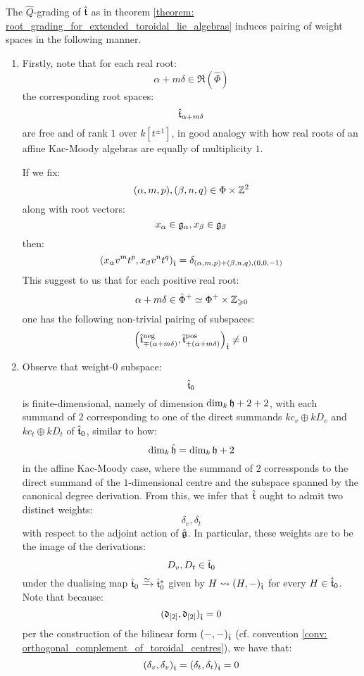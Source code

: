         \begin{remark} \label{remark: toroidal_root_systems}
            The $\hat{Q}$-grading of $\hat{\mathfrak{t}}$ as in theorem \ref{theorem: root_grading_for_extended_toroidal_lie_algebras} induces pairing of weight spaces in the following manner.
            \begin{enumerate}
                \item  Firstly, note that for each real root:
                    $$\alpha + m\delta \in \Re(\hat{\Phi})$$
                the corresponding root spaces:
                    $$\hat{\mathfrak{t}}_{\alpha + m\delta}$$
                are free and of rank $1$ over $k[t^{\pm 1}]$, in good analogy with how real roots of an affine Kac-Moody algebras are equally of multiplicity $1$.

                If we fix:
                    $$(\alpha, m, p), (\beta, n, q) \in \Phi \x \Z^2$$
                along with root vectors:
                    $$x_{\alpha} \in \mathfrak{g}_{\alpha}, x_{\beta} \in \mathfrak{g}_{\beta}$$
                then:
                    $$( x_{\alpha} v^m t^p, x_{\beta} v^n t^q )_{\hat{\mathfrak{t}}} = \delta_{(\alpha, m, p) + (\beta, n, q), (0, 0, -1)}$$
                This suggest to us that for each positive real root:
                    $$\alpha + m\delta \in \hat{\Phi}^+ \cong \Phi^+ \x \Z_{\geq 0}$$
                one has the following non-trivial pairing of subspaces:
                    $$\left( \hat{\mathfrak{t}}^{\mathrm{neg}}_{\mp (\alpha + m\delta)}, \hat{\mathfrak{t}}^{\mathrm{pos}}_{\pm (\alpha + m\delta)} \right)_{\hat{\mathfrak{t}}} \not = 0$$
                \item Observe that weight-$0$ subspace:
                    $$\hat{\mathfrak{t}}_0$$
                is finite-dimensional, namely of dimension $\dim_{k} \mathfrak{h} + 2 + 2$, with each summand of $2$ corresponding to one of the direct summands $k c_v \oplus k D_v$ and $k c_t \oplus k D_t$ of $\hat{\mathfrak{t}}_0$, similar to how:
                    $$\dim_{k} \hat{\mathfrak{h}} = \dim_{k} \mathfrak{h} + 2$$
                in the affine Kac-Moody case, where the summand of $2$ corressponds to the direct summand of the $1$-dimensional centre and the subspace spanned by the canonical degree derivation. From this, we infer that $\hat{\mathfrak{t}}$ ought to admit two distinct weights:
                    $$\delta_v, \delta_t$$
                with respect to the adjoint action of $\hat{\mathfrak{g}}$. In particular, these weights are to be the image of the derivations:
                    $$D_v, D_t \in \hat{\mathfrak{t}}_0$$
                under the dualising map $\hat{\mathfrak{t}}_0 \xrightarrow[]{\simeq} \hat{\mathfrak{t}}_0^*$ given by $H \leadsto (H, -)_{\hat{\mathfrak{t}}}$ for every $H \in \hat{\mathfrak{t}}_0$. Note that because:
                    $$(\mathfrak{d}_{[2]}, \mathfrak{d}_{[2]})_{\hat{\mathfrak{t}}} = 0$$
                per the construction of the bilinear form $(-, -)_{\hat{\mathfrak{t}}}$ (cf. convention \ref{conv: orthogonal_complement_of_toroidal_centres}), we have that:
                    $$(\delta_v, \delta_v)_{\hat{\mathfrak{t}}} = (\delta_t, \delta_t)_{\hat{\mathfrak{t}}} = 0$$


\end{enumerate}
\end{remark}
